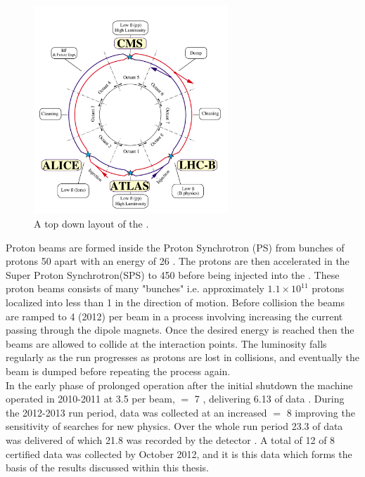 \begin{figure}[!h]

\centering
\includegraphics[width=0.65\textwidth]{plots/lhc-ring-photo.png}
\caption[A top down layout of the \LHC.]{A top down layout of the \LHC. \cite{Jean-Luc:841573}}  
\label{fig:lhc-ring}
\end{figure}


Proton beams are formed inside the Proton Synchrotron (PS) from bunches of protons 50 \ns apart with an energy of 26 \GeV. The protons are then accelerated in the Super Proton Synchrotron(SPS) to 450 \GeV  before being injected into the \LHC. These \LHC proton beams consists of many "bunches" i.e. approximately $1.1 \times 10^{11}$  protons localized into less than 1 \ns in the direction of motion. Before collision the beams are ramped to 4 \TeV (2012) per beam in a process involving increasing the current passing through the dipole magnets. Once the desired \com energy is reached then the beams are allowed to collide at the interaction points. The luminosity falls regularly as the run progresses as protons are lost in collisions, and eventually the beam is dumped before repeating the process again. \\

In the early phase of prolonged operation after the initial shutdown the machine operated in 2010-2011 at 3.5 \TeV per beam, \com $=$ 7 \TeV, delivering 6.13 \fb of data \cite{LHClumo}. During the 2012-2013 run period, data was collected at an increased \com $=$ 8 \TeV improving the sensitivity of searches for new physics. Over the whole run period 23.3 \fb of data was delivered of which 21.8 \fb was recorded by the \CMS detector \cite{LHClumo}. A total of 12 \fb of 8 \TeV certified data was collected by October 2012, and it is this data which forms the basis of the results discussed within this thesis.

